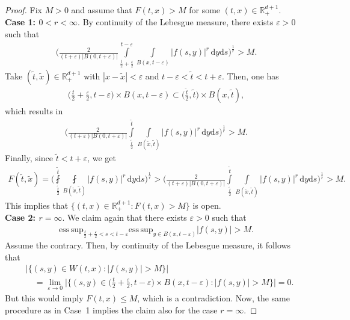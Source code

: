 \documentclass[11pt, leqno,parskip=half]{amsart}
\theoremstyle{definition}
\newcommand{\IR}{\mathbb{R}}
\renewcommand{\d}{\mathrm{d}}
\newcommand{\esssup}{\mathrm{ess\, sup}}
\numberwithin{equation}{section}
\begin{document}
\begin{proof}
    Fix $M>0$ and assume that $F(t,x)>M$ for some $(t,x)\in\IR^{d+1}_+$. \\

    \noindent\textbf{Case 1: $0<r<\infty$}. By continuity of the Lebesgue measure, there exists $\varepsilon>0$ such that
    \begin{align*}
        \bigg(\frac{2}{(t+\varepsilon)|B(0,t+\varepsilon)|}\int\limits_{\frac{t}{2}+\frac{\varepsilon}{2}}^{t-\varepsilon} \int\limits_{B(x,t-\varepsilon)}|f(s,y)|^r\,\d y \d s\bigg)^\frac{1}{r} >M.
    \end{align*}
    Take $(\tilde t, \tilde x)\in\IR^{d+1}_+$ with $|x-\tilde x|<\varepsilon$ and $t-\varepsilon<\tilde t <t +\varepsilon$. Then, one has
    \begin{align*}
        \Big(\frac{t}{2}+\frac{\varepsilon}{2} , t-\varepsilon \Big)\times B(x, t-\varepsilon) \subset \Big(\frac{\tilde t}{2}, \tilde t \Big)\times B(x, \tilde t),
    \end{align*}
    which results in
    \begin{align*}
        \bigg(\frac{2}{(t+\varepsilon)|B(0,t+\varepsilon)|}\int\limits_{\frac{\tilde t}{2}}^{\tilde t} \int\limits_{B(\tilde x,\tilde t)}|f(s,y)|^r\,\d y \d s\bigg)^\frac{1}{r} >M.
    \end{align*}
    Finally, since $\tilde t <t + \varepsilon$, we get
    \begin{align*}
        F(\tilde t, \tilde x) = \bigg(\fint\limits_{\frac{\tilde t}{2}}^{\tilde t} \fint\limits_{B(\tilde x,\tilde t)}|f(s,y)|^r\,\d y \d s\bigg)^\frac{1}{r}> \bigg(\frac{2}{(t+\varepsilon)|B(0,t+\varepsilon)|}\int\limits_{\frac{\tilde t}{2}}^{\tilde t} \int\limits_{B(\tilde x,\tilde t)}|f(s,y)|^r\,\d y \d s\bigg)^\frac{1}{r} >M.
    \end{align*}
    This implies that $\{(t,x)\in\IR^{d+1}_+: F(t,x)>M\}$ is open. \\

    \noindent\textbf{Case 2: $r= \infty$}. We claim again that there exists $\varepsilon>0$ such that
    \begin{align*}
        \esssup_{\frac{t}{2}+\frac{\varepsilon}{2} <s<t - \varepsilon} \esssup_{y\in B(x,t-\varepsilon)} |f(s,y)| >M.
    \end{align*}
    Assume the contrary. Then, by continuity of the Lebesgue measure, it follows that
    \begin{align*}
        &|\{(s,y)\in W(t,x) : |f(s,y)|>M \}|\\
        &\quad= \lim\limits_{\varepsilon\to 0} \Big|\{(s,y)\in \Big(\frac{t}{2}+\frac{\varepsilon}{2}, t - \varepsilon\Big)\times B(x,t-\varepsilon) : |f(s,y)|>M \}\Big| =0.
    \end{align*}
    But this would imply $F(t,x) \leq M$,
    which is a contradiction. Now, the same procedure as in Case~1 implies the claim also for the case $r=\infty$.
\end{proof}
\end{document}

